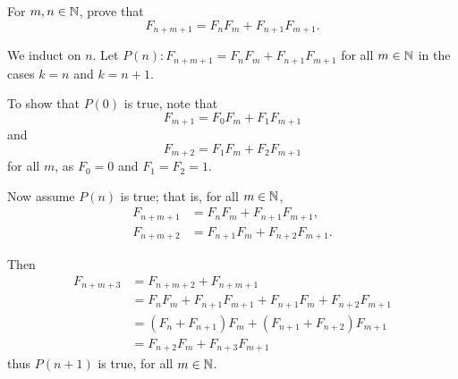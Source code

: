 \begin{exercise}
For $m,n\in\mathbb N$, prove that
\[ F_{n+m+1}=F_nF_m+F_{n+1}F_{m+1}. \]
\end{exercise}

\begin{solution}
We induct on $n$. Let $P(n):F_{n+m+1}=F_nF_m+F_{n+1}F_{m+1}$ for all $m\in\mathbb N$ in the cases $k=n$ and $k=n+1$.

To show that $P(0)$ is true, note that
\[ F_{m+1}=F_0F_m+F_1F_{m+1} \]
and
\[ F_{m+2}=F_1F_m+F_2F_{m+1} \]
for all $m$, as $F_0=0$ and $F_1=F_2=1$.

Now assume $P(n)$ is true; that is, for all $m\in\mathbb N$,
\begin{align*}
F_{n+m+1}&=F_nF_m+F_{n+1}F_{m+1},\\
F_{n+m+2}&=F_{n+1}F_m+F_{n+2}F_{m+1}.
\end{align*}

Then
\begin{align*}
F_{n+m+3}
&=F_{n+m+2}+F_{n+m+1}\\
&=F_n F_m+F_{n+1}F_{m+1}+F_{n+1}F_m+F_{n+2}F_{m+1}\\
&=(F_n+F_{n+1})F_m+(F_{n+1}+F_{n+2})F_{m+1}\\
&=F_{n+2}F_m+F_{n+3}F_{m+1}
\end{align*}
thus $P(n+1)$ is true, for all $m\in\mathbb N$.
\end{solution}